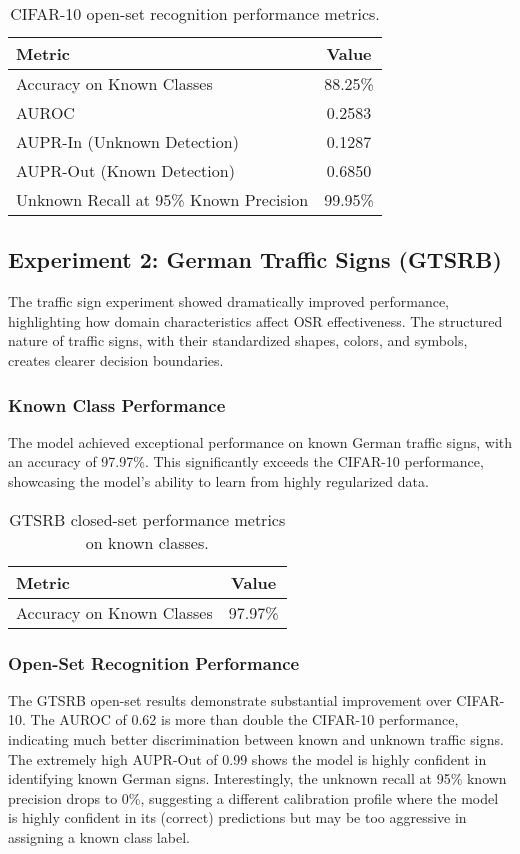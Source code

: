 \documentclass[11pt, a4paper]{article}
\begin{document}
\begin{table}[H]
\centering
\begin{tabular}{lc}
\toprule
\textbf{Metric} & \textbf{Value} \\
\midrule
Accuracy on Known Classes & 88.25\% \\
AUROC & 0.2583 \\
AUPR-In (Unknown Detection) & 0.1287 \\
AUPR-Out (Known Detection) & 0.6850 \\
Unknown Recall at 95\% Known Precision & 99.95\% \\
\bottomrule
\end{tabular}
\caption{CIFAR-10 open-set recognition performance metrics.}
\label{tab:cifar10_osr_metrics}
\end{table}

\subsection{Experiment 2: German Traffic Signs (GTSRB)}
The traffic sign experiment showed dramatically improved performance, highlighting how domain characteristics affect OSR effectiveness. The structured nature of traffic signs, with their standardized shapes, colors, and symbols, creates clearer decision boundaries.

\subsubsection{Known Class Performance}
The model achieved exceptional performance on known German traffic signs, with an accuracy of 97.97\%. This significantly exceeds the CIFAR-10 performance, showcasing the model's ability to learn from highly regularized data.

\begin{table}[H]
\centering
\begin{tabular}{lc}
\toprule
\textbf{Metric} & \textbf{Value} \\
\midrule
Accuracy on Known Classes & 97.97\% \\
\bottomrule
\end{tabular}
\caption{GTSRB closed-set performance metrics on known classes.}
\label{tab:gtsrb_closed_set_metrics}
\end{table}

\subsubsection{Open-Set Recognition Performance}
The GTSRB open-set results demonstrate substantial improvement over CIFAR-10. The AUROC of 0.62 is more than double the CIFAR-10 performance, indicating much better discrimination between known and unknown traffic signs. The extremely high AUPR-Out of 0.99 shows the model is highly confident in identifying known German signs. Interestingly, the unknown recall at 95\% known precision drops to 0\%, suggesting a different calibration profile where the model is highly confident in its (correct) predictions but may be too aggressive in assigning a known class label.
\end{document}
